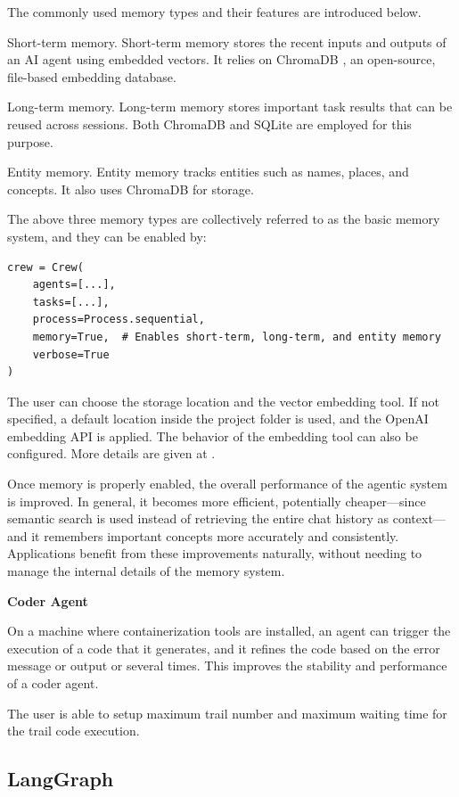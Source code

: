 The commonly used memory types and their features are introduced below.

Short-term memory. Short-term memory stores the recent inputs and outputs of an AI agent using embedded vectors. It relies on ChromaDB \cite{chroma2025chroma}, an open-source, file-based embedding database.

Long-term memory. Long-term memory stores important task results that can be reused across sessions. Both ChromaDB and SQLite are employed for this purpose.

Entity memory. Entity memory tracks entities such as names, places, and concepts. It also uses ChromaDB for storage.

The above three memory types are collectively referred to as the basic memory system, and they can be enabled by:
\begin{lstlisting}
crew = Crew(
    agents=[...],
    tasks=[...],
    process=Process.sequential,
    memory=True,  # Enables short-term, long-term, and entity memory
    verbose=True
)
\end{lstlisting}

The user can choose the storage location and the vector embedding tool. If not specified, a default location inside the project folder is used, and the OpenAI embedding API is applied. The behavior of the embedding tool can also be configured. More details are given at \cite{crewai2025memory}.

Once memory is properly enabled, the overall performance of the agentic system is improved. In general, it becomes more efficient, potentially cheaper—since semantic search is used instead of retrieving the entire chat history as context—and it remembers important concepts more accurately and consistently. Applications benefit from these improvements naturally, without needing to manage the internal details of the memory system.

\vspace{0.1in}
\noindent \textbf{Coder Agent}
\vspace{0.1in}

On a machine where containerization tools are installed, an agent can trigger the execution of a code that it generates, and it refines the code based on the error message or output or several times. This improves the stability and performance of a coder agent.

The user is able to setup maximum trail number and maximum waiting time for the trail code execution.

\subsection{LangGraph}

